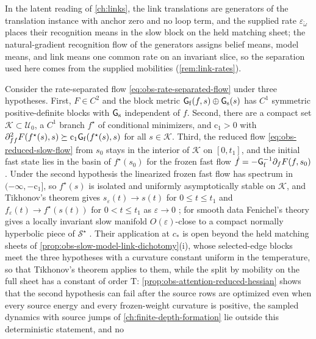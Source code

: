 In the latent reading of \cref{ch:links}, the link translations are generators of the translation
instance with anchor zero and no loop term, and the supplied rate $\varepsilon_{\check\omega}$ places
their recognition means in the slow block on the held matching sheet; the natural-gradient recognition
flow of the generators assigns belief means, model means, and link means one common rate on an invariant
slice, so the separation used here comes from the supplied mobilities (\cref{rem:link-rates}).

Consider the rate-separated flow \eqref{eq:obs-rate-separated-flow} under three
hypotheses. First, $F\in C^2$ and the block metric
$\mathsf G_{\rm f}(f,s)\oplus\mathsf G_{\rm s}(s)$ has $C^1$ symmetric
positive-definite blocks with $\mathsf G_{\rm s}$ independent of $f$. Second, there
are a compact set $\mathcal K\subset\mathcal U_0$, a $C^1$ branch $f^\star$ of
conditional minimizers, and $\mathrm c_1>0$ with
$\partial^2_{ff}F(f^\star(s),s)\succeq\mathrm c_1\mathsf G_{\rm f}(f^\star(s),s)$ for
all $s\in\mathcal K$. Third, the reduced flow \eqref{eq:obs-reduced-slow-flow} from
$s_0$ stays in the interior of $\mathcal K$ on $[0,t_1]$, and the initial fast state
lies in the basin of $f^\star(s_0)$ for the frozen fast flow
$\dot f=-\mathsf G_{\rm f}^{-1}\partial_fF(f,s_0)$. Under the second hypothesis the
linearized frozen fast flow has spectrum in $(-\infty,-\mathrm c_1]$, so $f^\star(s)$
is isolated and uniformly asymptotically stable on $\mathcal K$, and Tikhonov's
theorem gives $s_\varepsilon(t)\to s(t)$ for $0\leq t\leq t_1$ and
$f_\varepsilon(t)\to f^\star(s(t))$ for $0<t\leq t_1$ as $\varepsilon\to0$
\citep{Tikhonov1952}; for smooth data Fenichel's theory gives a locally invariant
slow manifold $O(\varepsilon)$-close to a compact normally hyperbolic piece of
$\mathcal S^\star$ \citep{fenichel1979geometric}. Their application at $c_*$ is open
beyond the held matching sheets of \cref{prop:obs-slow-model-link-dichotomy}(i),
whose selected-edge blocks meet the three hypotheses with a curvature constant
uniform in the temperature, so that Tikhonov's theorem applies to them, while the
split by mobility on the full sheet has a constant of order $\mathrm T$:
\cref{prop:obs-attention-reduced-hessian} shows that the second hypothesis can fail
after the source rows are optimized even when every source energy and every
frozen-weight curvature is positive, the sampled dynamics with source jumps of
\cref{ch:finite-depth-formation} lie outside this deterministic statement, and no
